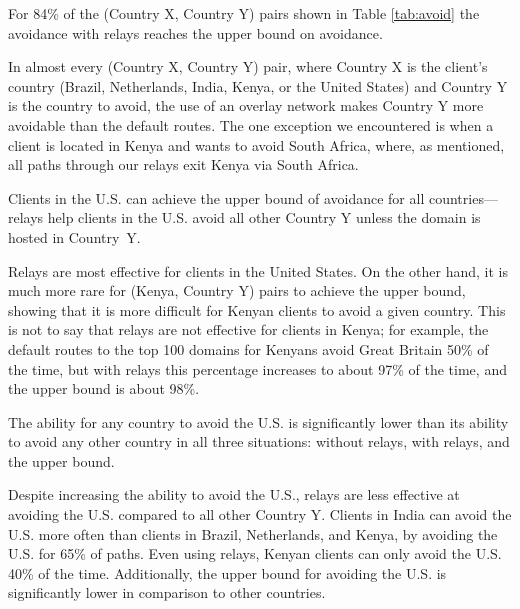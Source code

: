 \begin{finding}
For 84\% of the (Country X, Country Y) pairs shown in Table \ref{tab:avoid} the avoidance with relays reaches the upper bound on avoidance. 
\end{finding}
\noindent
In almost every (Country X, Country Y) pair, where Country X is the
client's country (Brazil, Netherlands, India, Kenya, or the United
States) and Country Y is the country to avoid, the use of an overlay
network makes Country Y more avoidable than the default routes.  The one
exception we encountered is when a client is located in Kenya and wants
to avoid South Africa, where, as mentioned, all paths through our
relays exit Kenya via South Africa.

\begin{finding}
Clients in the U.S. can achieve the upper bound of avoidance for all
countries---relays help clients in
the U.S. avoid all other Country Y unless the domain is hosted in Country~Y.  
\end{finding}
\noindent
Relays are most effective for clients in the United States.  On the other hand, it is much more rare for (Kenya, Country Y) pairs to achieve the upper bound, showing that it is more difficult for Kenyan clients to avoid a given country.  This is not to say that relays are not effective for clients in Kenya; for example, the default routes to the top 100 domains for Kenyans avoid Great Britain 50\% of the time, but with relays this percentage increases to about 97\% of the time, and the upper bound is about 98\%. 

\begin{finding}
The ability for any country to avoid the U.S. is significantly lower than its ability to avoid any other country in all three situations: without relays, with relays, and the upper bound. 
\end{finding}
\noindent
Despite increasing the ability to avoid the U.S., relays are less
effective at avoiding the U.S. compared to all other Country Y.
Clients in India can avoid the U.S. more often than clients in Brazil,
Netherlands, and Kenya, by avoiding the U.S. for 65\% of paths.  Even
using relays, Kenyan clients can only avoid the U.S. 40\% of the time.  Additionally, the upper bound for avoiding the U.S. is significantly lower in comparison to other countries.  

